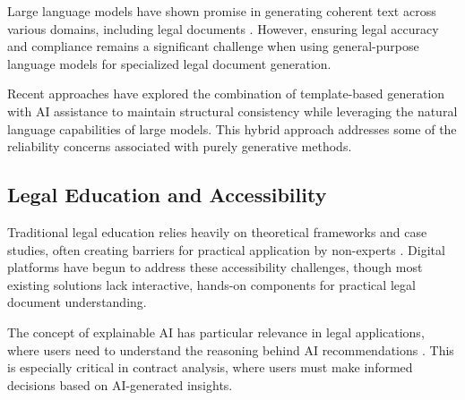 Large language models have shown promise in generating coherent text across various domains, including legal documents \cite{brown2020language}. However, ensuring legal accuracy and compliance remains a significant challenge when using general-purpose language models for specialized legal document generation.

Recent approaches have explored the combination of template-based generation with AI assistance to maintain structural consistency while leveraging the natural language capabilities of large models. This hybrid approach addresses some of the reliability concerns associated with purely generative methods.

\subsection{Legal Education and Accessibility}

Traditional legal education relies heavily on theoretical frameworks and case studies, often creating barriers for practical application by non-experts \cite{susskind2017future}. Digital platforms have begun to address these accessibility challenges, though most existing solutions lack interactive, hands-on components for practical legal document understanding.

The concept of explainable AI has particular relevance in legal applications, where users need to understand the reasoning behind AI recommendations \cite{gunning2017explainable}. This is especially critical in contract analysis, where users must make informed decisions based on AI-generated insights.
